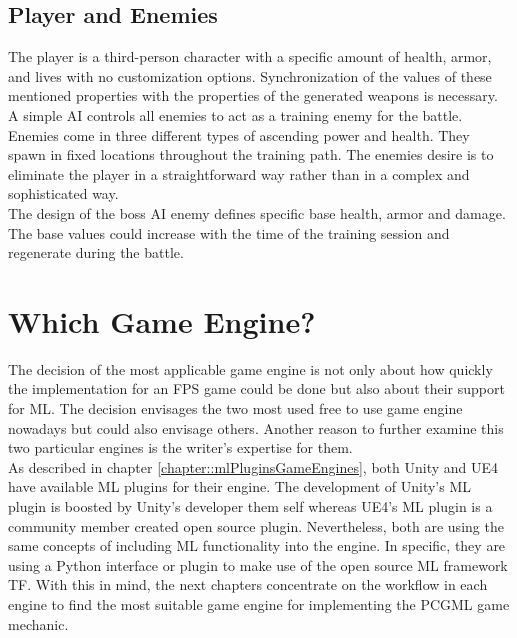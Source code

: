 \documentclass[MGS,Master,english]{twbook}%
\begin{document}
\subsection{Player and Enemies}
The player is a third-person character with a specific amount of health, armor, and lives with no customization options. Synchronization of the values of these mentioned properties with the properties of the generated weapons is necessary.\\
A simple AI controls all enemies to act as a training enemy for the battle. Enemies come in three different types of ascending power and health. They spawn in fixed locations throughout the training path. The enemies desire is to eliminate the player in a straightforward way rather than in a complex and sophisticated way. \\
The design of the boss AI enemy defines specific base health, armor and damage. The base values could increase with the time of the training session and regenerate during the battle.


\section{Which Game Engine?}
The decision of the most applicable game engine is not only about how quickly the implementation for an FPS game could be done but also about their support for ML. The decision envisages the two most used free to use game engine nowadays but could also envisage others. Another reason to further examine this two particular engines is the writer's expertise for them.\\
As described in chapter \ref{chapter::mlPluginsGameEngines}, both Unity and UE4 have available ML plugins for their engine. The development of Unity's ML plugin is boosted by Unity's developer them self whereas UE4's ML plugin is a community member created open source plugin. Nevertheless, both are using the same concepts of including ML functionality into the engine. In specific, they are using a Python interface or plugin to make use of the open source ML framework \acf{TF}. With this in mind, the next chapters concentrate on the workflow in each engine to find the most suitable game engine for implementing the PCGML game mechanic.
\end{document}
